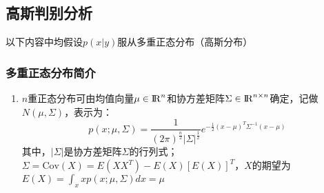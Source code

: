 \subsection{高斯判别分析}
以下内容中均假设$p(x|y)$服从多重正态分布（高斯分布）

\subsubsection{多重正态分布简介}
\begin{enumerate}
	\item $n$重正态分布可由均值向量$\mu \in {\rm I\!R}^n$和协方差矩阵$\Sigma \in {\rm I\!R}^{n\times n}$确定，记做$N(\mu, \Sigma)$，表示为：
	\begin{equation}
		p(x; \mu, \Sigma) = \frac{1}{(2\pi)^{\frac{n}{2}}|\Sigma|^\frac{1}{2}}e^{-\frac{1}{2}(x-\mu)^T\Sigma^{-1}(x-\mu)}
	\end{equation}
	其中，$|\Sigma|$是协方差矩阵$\Sigma$的行列式；$\Sigma=\mathrm{Cov}(X) = E(XX^T) - E(X)\left[E(X)\right]^T$，$X$的期望为$E(X) = \int_{x}xp(x;\mu,\Sigma)dx = \mu$
\end{enumerate}

